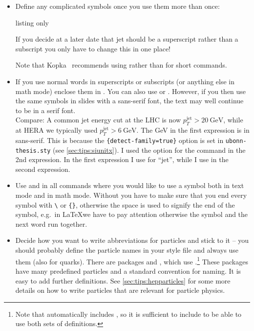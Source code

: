 \begin{itemize}
\item Define any complicated symbols once you use them more than
  once:
\begin{tcblisting}{listing only}
\newcommand*{\etajet}{\ensuremath{\eta_{\text{jet}}}\xspace}
\end{tcblisting}
  If you decide at a later date that jet should be a superscript
  rather than a subscript you only have to change this in one place!

  Note that Kopka~\cite{kopka04}
  recommends using  rather than 
  for short commands.

\item If you use normal words in superscripts or subscripts (or
  anything else in math mode) enclose them in . You can
  also use  or . However, if you then use
  the same symbols in slides with a sans-serif font, the text may well
  continue to be in a serif font.\\
  {\sffamily Compare: A common jet energy cut at the LHC is now
    \(p_{T}^{\text{jet}} > \qty{20}{\GeV}\), while at HERA we typically
    used \(p_{T}^{\mathrm{jet}} > \qty[detect-family=false]{6}{\GeV}\).
  }
  The \unit{\GeV} in the first expression is in sans-serif. This is
  because the
  \texttt{\{detect-family=true\}}
  option is set in \texttt{ubonn-thesis.sty}
  (see \cref{sec:tips:siunitx}).  I used the option
  for the  command in the 2nd expression.
  In the first expression I use  for \enquote{jet}, while
  I use  in the second expression.

\item Use  and
   in all commands where you would
  like to use a symbol both in text mode and in math mode. Without
   you have to make sure that you end every symbol with
  \texttt{\textbackslash} or \texttt{\{\}}, otherwise the space is used
  to signify the end of the symbol, e.g.\ in \LaTeX we have to pay
  attention otherwise the symbol and the next word run together.

\item Decide how you want to write abbreviations for particles and
  stick to it -- you should probably define the particle names in your
  style file and always use them (also for quarks).
  There are packages  and ,
  which use .\footnote{%
    Note that  automatically includes ,
    so it is sufficient to include  to be able to use both sets of definitions.}
  These packages have many predefined particles and a standard convention for naming.
  It is easy to add further definitions.
  See \cref{sec:tips:hepparticles} for some more details on how to write particles
  that are relevant for particle physics.


\end{itemize}
